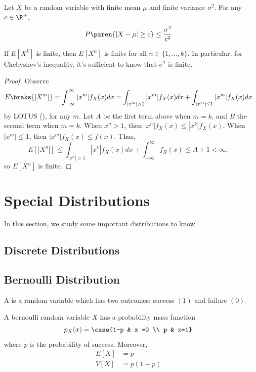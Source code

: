 \documentclass[11pt]{article}
\begin{document}
\begin{thm}
    Let $X$ be a random variable with finite mean $\mu$ and finite variance $\sigma^2$. For any $c \in \R^+$,
    \[
    P\paren{ |X-\mu| \geq c} \le \frac{\sigma^2}{c^2}
    \]
\end{thm}

\begin{prop}
    If $E[X^k]$ is finite, then $E[X^n]$ is finite for all $n \in \{1,\dots,k\}$. In particular, for Chebyshev's inequality, it's sufficient to know that $\sigma^2$ is finite.
\end{prop}

\begin{proof}
    Observe
    \[
    E\braks{|X^m|}=\int_{-\infty}^\infty |x^m|f_X(x)dx=\int_{|x^m|>1}|x^m|f_X(x)dx + \int_{|x^m| \leq 1} |x^m|f_X(x)dx
    \]
    by LOTUS (), for any $m$. Let $A$ be the first term above when $m=k$, and $B$ the second term when $m=k$. When $x^n>1$, then $|x^n|f_X(x)\leq |x^k|f_X(x)$. When $|x^m|\leq 1$, then $|x^m|f_X(x) \leq f(x)$. Thus,
    \[
    E[|X^n|] \leq \int_{|x^n|>1}|x^k|f_X(x)dx + \int_{-\infty}^\infty f_X(x)\leq A+1 < \infty,
    \]
    so $E[X^n]$ is finite.
\end{proof}

\section{Special Distributions}

In this section, we study some important distributions to know.

\subsection*{Discrete Distributions}

\subsection{Bernoulli Distribution}

\begin{defn}
A  is a random variable which has two outcomes: success $(1)$ and failure $(0)$.
\end{defn}

\begin{prop}
A bernoulli random variable $X$ has a probability mass function
\[
p_X(x) = \case{1-p & x =0 \\ p & x=1}
\]
where $p$ is the probability of success. Moreover,
\begin{align*}
    E[X] &= p
    \\ V[X] &=p(1-p)
\end{align*}
\end{prop}
\end{document}
